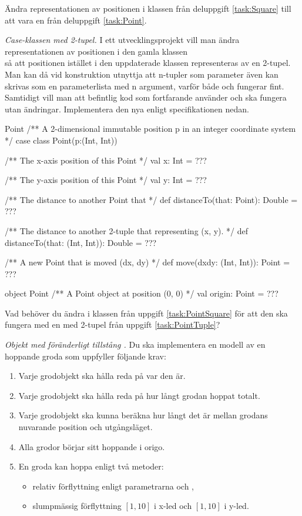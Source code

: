 \Task \label{task:PointSquare}Ändra representationen av positionen i klassen  från deluppgift \ref{task:Square} till att vara en  från deluppgift \ref{task:Point}.


\Task \label{task:PointTuple} \emph{Case-klassen  med 2-tupel.} I ett utvecklingsprojekt vill man ändra representationen av positionen i den gamla klassen  \\  så att positionen istället i den uppdaterade klassen representeras av en 2-tupel. Man kan då vid konstruktion utnyttja att n-tupler som parameter även kan skrivas som en parameterlista med n argument, varför både  och  fungerar fint. Samtidigt vill man att befintlig kod som fortfarande använder  och  ska fungera utan ändringar.  Implementera den nya  enligt specifikationen nedan. 
\begin{ScalaSpec}{Point}
/** A 2-dimensional immutable position p in an integer coordinate system */ 
case class Point(p:(Int, Int)) {
  /** The x-axis position of this Point */
  val x: Int = ???

  /** The y-axis position of this Point */
  val y: Int = ???

  /** The distance to another Point that */
  def distanceTo(that: Point): Double = ???

  /** The distance to another 2-tuple that representing (x, y). */
  def distanceTo(that: (Int, Int)): Double = ???

  /** A new Point that is moved (dx, dy) */
  def move(dxdy: (Int, Int)): Point = ???
}

object Point {
  /** A Point object at position (0, 0) */ 
  val origin: Point = ???
}
\end{ScalaSpec}

\Task\Pen Vad behöver du ändra i klassen  från uppgift \ref{task:PointSquare} för att den ska fungera med en  med 2-tupel från uppgift \ref{task:PointTuple}?

\Task \emph{Objekt med föränderligt tillstång .} Du ska implementera en modell av en hoppande groda som uppfyller följande krav: 
\begin{enumerate}
\item Varje grodobjekt ska hålla reda på var den är.
\item Varje grodobjekt ska hålla reda på hur långt grodan hoppat totalt.
\item Varje grodobjekt ska kunna beräkna hur långt det är mellan grodans nuvarande position och utgångsläget.
\item Alla grodor börjar sitt hoppande i origo.
\item En groda kan hoppa enligt två metoder: 
  \begin{itemize} [nolistsep, noitemsep]
  \item relativ förflyttning enligt parametrarna  och ,  
  \item slumpmässig förflyttning $[1, 10]$ i x-led och $[1, 10]$ i y-led. 
  \end{itemize}
\end{enumerate}

